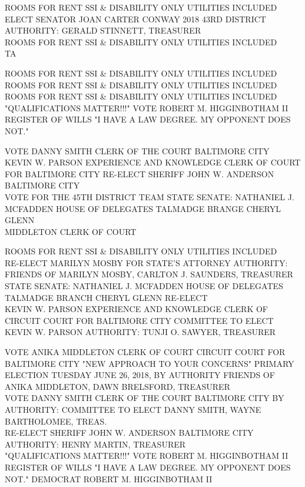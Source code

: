 \documentclass[10pt,letterpaper]{article}
\begin{document}
ROOMS FOR RENT SSI \& DISABILITY ONLY UTILITIES INCLUDED\\
ELECT SENATOR JOAN CARTER CONWAY 2018 43RD DISTRICT AUTHORITY: GERALD STINNETT, TREASURER\\
ROOMS FOR RENT SSI \& DISABILITY ONLY UTILITIES INCLUDED\\
TA

ROOMS FOR RENT SSI \& DISABILITY ONLY UTILITIES INCLUDED\\
ROOMS FOR RENT SSI \& DISABILITY ONLY UTILITIES INCLUDED\\
ROOMS FOR RENT SSI \& DISABILITY ONLY UTILITIES INCLUDED\\
"QUALIFICATIONS MATTER!!!" VOTE ROBERT M. HIGGINBOTHAM II REGISTER OF WILLS "I HAVE A LAW DEGREE.  MY OPPONENT DOES NOT."

VOTE DANNY SMITH CLERK OF THE COURT BALTIMORE CITY\\
KEVIN W. PARSON EXPERIENCE AND KNOWLEDGE CLERK OF COURT FOR BALTIMORE CITY RE{-}ELECT SHERIFF JOHN W. ANDERSON BALTIMORE CITY\\
VOTE FOR THE 45TH DISTRICT TEAM STATE SENATE: NATHANIEL J. MCFADDEN HOUSE OF DELEGATES TALMADGE BRANGE CHERYL GLENN\\
MIDDLETON CLERK OF COURT

ROOMS FOR RENT SSI \& DISABILITY ONLY UTILITIES INCLUDED\\
RE{-}ELECT MARILYN MOSBY FOR STATE'S ATTORNEY AUTHORITY: FRIENDS OF MARILYN MOSBY, CARLTON J. SAUNDERS, TREASURER\\
STATE SENATE: NATHANIEL J. MCFADDEN HOUSE OF DELEGATES TALMADGE BRANCH CHERYL GLENN RE{-}ELECT\\
KEVIN W. PARSON EXPERIENCE AND KNOWLEDGE CLERK OF CIRCUIT COURT FOR BALTIMORE CITY COMMITTEE TO ELECT KEVIN W. PARSON AUTHORITY: TUNJI O. SAWYER, TREASURER

VOTE ANIKA MIDDLETON CLERK OF COURT CIRCUIT COURT FOR BALTIMORE CITY "NEW APPROACH TO YOUR CONCERNS" PRIMARY ELECTION TUESDAY JUNE 26, 2018, BY AUTHORITY FRIENDS OF ANIKA MIDDLETON, DAWN BRELSFORD, TREASURER\\
VOTE DANNY SMITH CLERK OF THE COURT BALTIMORE CITY BY AUTHORITY: COMMITTEE TO ELECT DANNY SMITH, WAYNE BARTHOLOMEE, TREAS.\\
RE{-}ELECT SHERIFF JOHN W. ANDERSON BALTIMORE CITY AUTHORITY: HENRY MARTIN, TREASURER\\
"QUALIFICATIONS MATTER!!!" VOTE ROBERT M. HIGGINBOTHAM II REGISTER OF WILLS "I HAVE A LAW DEGREE.  MY OPPONENT DOES NOT."  DEMOCRAT ROBERT M. HIGGINBOTHAM II
\end{document}
